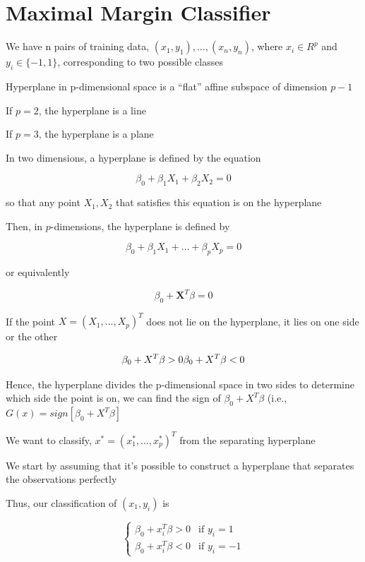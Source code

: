 \documentclass[
]{book}
\begin{document}
\hypertarget{maximal-margin-classifier}{%
\section{Maximal Margin Classifier}\label{maximal-margin-classifier}}

We have n pairs of training data, \((x_1, y_1), \dots, (x_n, y_n)\), where \(x_i \in R^p\) and \(y_i \in \{-1, 1\}\), corresponding to two possible classes

Hyperplane in p-dimensional space is a ``flat'' affine subspace of dimension \(p-1\)

If \(p = 2\), the hyperplane is a line

If \(p = 3\), the hyperplane is a plane

In two dimensions, a hyperplane is defined by the equation

\[
\beta_0 + \beta_1 X_1 + \beta_2 X_2 = 0
\]

so that any point \(X_1, X_2\) that satisfies this equation is on the hyperplane

Then, in \(p\)-dimensions, the hyperplane is defined by

\[
\beta_0 + \beta_1 X_1 + \dots + \beta_p X_p = 0
\]

or equivalently

\[
\beta_0 + \mathbf{X}^T \beta = 0
\]

If the point \(X = (X_1, \dots, X_p)^T\) does not lie on the hyperplane, it lies on one side or the other

\[
\beta_0 + X^T \beta >0 \\
\beta_0 + X^T \beta <0
\]

Hence, the hyperplane divides the p-dimensional space in two sides to determine which side the point is on, we can find the sign of \(\beta_0 + X^T \beta\) (i.e., \(G(x) = sign [\beta_0 + X^T \beta]\)

We want to classify, \(x^* = (x_1^*, \dots, x^*_p)^T\) from the separating hyperplane

We start by assuming that it's possible to construct a hyperplane that separates the observations perfectly

Thus, our classification of \((x_1, y_i)\) is

\[
\begin{cases}
\beta_0 + x_i^T \beta > 0 & \text{if } y_i = 1 \\
\beta_0 + x_i^T \beta <0 & \text{if } y_i = -1
\end{cases}
\]
\end{document}
